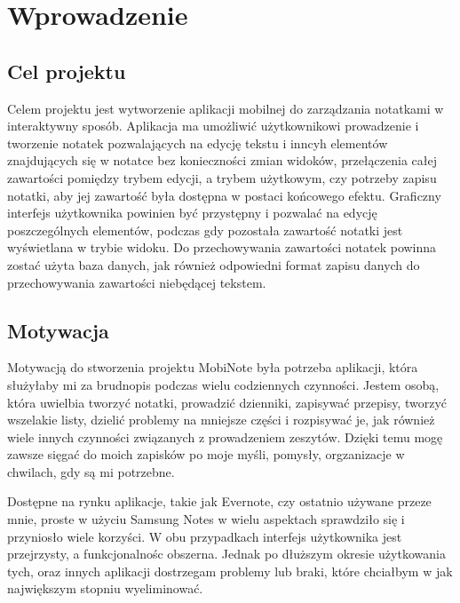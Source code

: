 \documentclass[shortabstract]{iithesis}
\author         {Bartosz Sobocki}
\begin{document}

\chapter{Wprowadzenie}

\section{Cel projektu}

Celem projektu jest wytworzenie aplikacji mobilnej do zarządzania notatkami w interaktywny sposób.
Aplikacja ma umożliwić użytkownikowi prowadzenie i tworzenie notatek pozwalających na edycję tekstu i inncyh elementów znajdujących się w notatce bez konieczności zmian widoków, przełączenia całej zawartości pomiędzy trybem edycji, a trybem użytkowym, czy potrzeby zapisu notatki, aby jej zawartość była dostępna w postaci końcowego efektu.
Graficzny interfejs użytkownika powinien być przystępny i pozwalać na edycję poszczególnych elementów, podczas gdy pozostała zawartość notatki jest wyświetlana w trybie widoku.
Do przechowywania zawartości notatek powinna zostać użyta baza danych, jak również odpowiedni format zapisu danych do przechowywania zawartości niebędącej tekstem.

\section{Motywacja}

Motywacją do stworzenia projektu MobiNote była potrzeba aplikacji, która służyłaby mi za brudnopis podczas wielu codziennych czynności. Jestem osobą, która uwielbia tworzyć notatki, prowadzić dzienniki, zapisywać przepisy, tworzyć wszelakie listy, dzielić problemy na mniejsze części i rozpisywać je, jak również wiele innych czynności związanych z prowadzeniem zeszytów. Dzięki temu mogę zawsze sięgać do moich zapisków po moje myśli, pomysły, orgzanizacje w chwilach, gdy są mi potrzebne.

Dostępne na rynku aplikacje, takie jak Evernote, czy ostatnio używane przeze mnie, proste w użyciu Samsung Notes w wielu aspektach sprawdziło się i przyniosło wiele korzyści. W obu przypadkach interfejs użytkownika jest przejrzysty, a funkcjonalnośc obszerna. Jednak po dłuższym okresie użytkowania tych, oraz innych aplikacji dostrzegam problemy lub braki, które chciałbym w jak największym stopniu wyeliminować.
\end{document}
